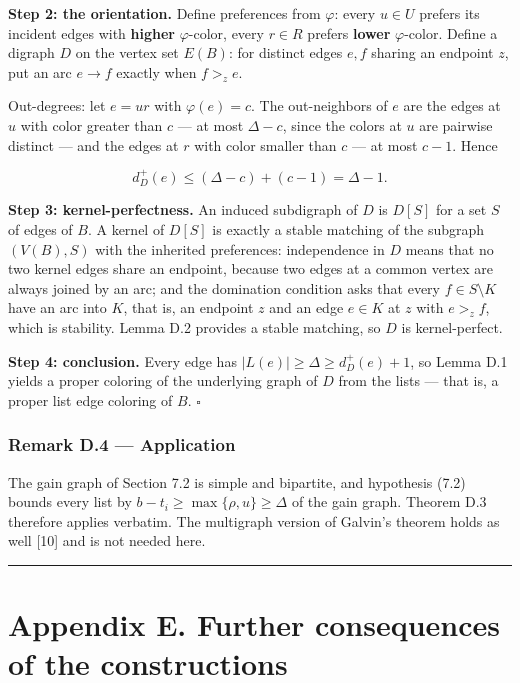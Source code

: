\documentclass[english,11pt,a4paper]{article}
\begin{document}
\textbf{Step 2: the orientation.} Define preferences from \(\varphi\):
every \(u\in U\) prefers its incident edges with \textbf{higher}
\(\varphi\)-color, every \(r\in R\) prefers \textbf{lower}
\(\varphi\)-color. Define a digraph \(D\) on the vertex set \(E(B)\):
for distinct edges \(e,f\) sharing an endpoint \(z\), put an arc
\(e\to f\) exactly when \(f>_ze\).

Out-degrees: let \(e=ur\) with \(\varphi(e)=c\). The out-neighbors of
\(e\) are the edges at \(u\) with color greater than \(c\) --- at most
\(\Delta-c\), since the colors at \(u\) are pairwise distinct --- and
the edges at \(r\) with color smaller than \(c\) --- at most \(c-1\).
Hence

\[
d^+_D(e)\le(\Delta-c)+(c-1)=\Delta-1.
\]

\textbf{Step 3: kernel-perfectness.} An induced subdigraph of \(D\) is
\(D[S]\) for a set \(S\) of edges of \(B\). A kernel of \(D[S]\) is
exactly a stable matching of the subgraph \((V(B),S)\) with the
inherited preferences: independence in \(D\) means that no two kernel
edges share an endpoint, because two edges at a common vertex are always
joined by an arc; and the domination condition asks that every
\(f\in S\setminus K\) have an arc into \(K\), that is, an endpoint \(z\)
and an edge \(e\in K\) at \(z\) with \(e>_zf\), which is stability.
Lemma D.2 provides a stable matching, so \(D\) is kernel-perfect.

\textbf{Step 4: conclusion.} Every edge has
\(|L(e)|\ge\Delta\ge d^+_D(e)+1\), so Lemma D.1 yields a proper coloring
of the underlying graph of \(D\) from the lists --- that is, a proper
list edge coloring of \(B\). \(\square\)

\subsubsection{Remark D.4 --- Application}\label{remark-d.4-application}

The gain graph of Section 7.2 is simple and bipartite, and hypothesis
(7.2) bounds every list by \(b-t_i\ge\max\{\rho,u\}\ge\Delta\) of the
gain graph. Theorem D.3 therefore applies verbatim. The multigraph
version of Galvin's theorem holds as well {[}10{]} and is not needed
here.

\begin{center}\rule{0.5\linewidth}{0.5pt}\end{center}

\section{Appendix E. Further consequences of the
constructions}\label{appendix-e.-further-consequences-of-the-constructions}
\end{document}
